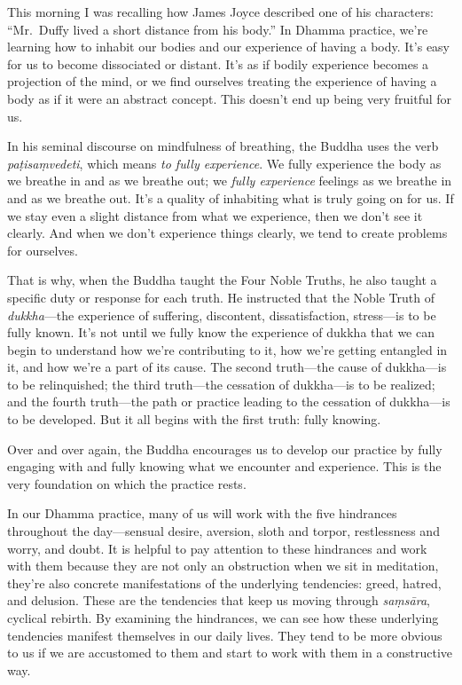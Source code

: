 
This morning I was recalling how James Joyce described one of his 
characters: ``Mr. Duffy lived a short distance from his body.'' In 
Dhamma practice, we're learning how to inhabit our bodies and our 
experience of having a body. It's easy for us to become dissociated or 
distant. It's as if bodily experience becomes a projection of the mind, 
or we find ourselves treating the experience of having a body as if it 
were an abstract concept. This doesn't end up being very fruitful for 
us.

In his seminal discourse on mindfulness of breathing, the Buddha uses 
the verb \emph{paṭisaṃvedeti}, which means \emph{to fully 
experience}. We fully experience the body as we breathe in and as we 
breathe out; we \emph{fully experience} feelings as we breathe in and 
as we breathe out. It's a quality of inhabiting what is truly going on 
for us. If we stay even a slight distance from what we experience, then 
we don't see it clearly. And when we don't experience things clearly, 
we tend to create problems for ourselves.

That is why, when the Buddha taught the Four Noble Truths, he also 
taught a specific duty or response for each truth. He instructed that 
the Noble Truth of \emph{dukkha}---the experience of suffering, 
discontent, dissatisfaction, stress---is to be fully known. It's not 
until we fully know the experience of dukkha that we can begin to 
understand how we're contributing to it, how we're getting entangled in 
it, and how we're a part of its cause. The second truth---the cause of 
dukkha---is to be relinquished; the third truth---the cessation of 
dukkha---is to be realized; and the fourth truth---the path or practice 
leading to the cessation of dukkha---is to be developed. But it all 
begins with the first truth: fully knowing.

Over and over again, the Buddha encourages us to develop our practice 
by fully engaging with and fully knowing what we encounter and 
experience. This is the very foundation on which the practice rests.


In our Dhamma practice, many of us will work with the five hindrances 
throughout the day---sensual desire, aversion, sloth and torpor, 
restlessness and worry, and doubt. It is helpful to pay attention to 
these hindrances and work with them because they are not only an 
obstruction when we sit in meditation, they're also concrete 
manifestations of the underlying tendencies: greed, hatred, and 
delusion. These are the tendencies that keep us moving through 
\emph{saṃsāra}, cyclical rebirth. By examining the hindrances, we 
can see how these underlying tendencies manifest themselves in our 
daily lives. They tend to be more obvious to us if we are accustomed to 
them and start to work with them in a constructive way.

